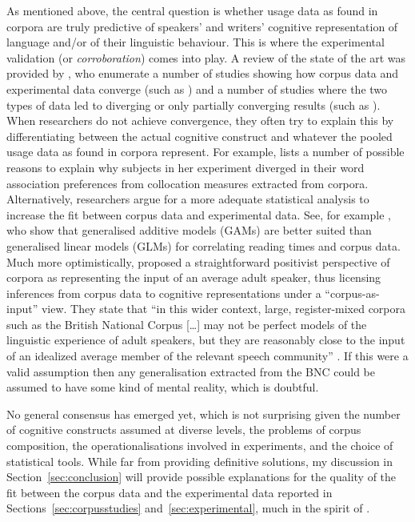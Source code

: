 As mentioned above, the central question is whether usage data as found in corpora are truly predictive of speakers' and writers' cognitive representation of language and\slash or of their linguistic behaviour.
This is where the experimental validation (or \textit{corroboration}) comes into play.
A review of the state of the art was provided by \cite{NewmanSorensenduncan2015}, who enumerate a number of studies showing how corpus data and experimental data converge (such as \citealp{BresnanEa2007,DurrantDoherty2010,GriesWulff2005,GriesEa2005}) and a number of studies where the two types of data led to diverging or only partially converging results (such as \citealp{ArppeJaervikivi2007,Dabrowska2014,Mollin2009}).
When researchers do not achieve convergence, they often try to explain this by differentiating between the actual cognitive construct and whatever the pooled usage data as found in corpora represent.
For example, \citet[411]{Dabrowska2014} lists a number of possible reasons to explain why subjects in her experiment diverged in their word association preferences from collocation measures extracted from corpora.
Alternatively, researchers argue for a more adequate statistical analysis to increase the fit between corpus data and experimental data.
See, for example \cite{DivjakEa2016}, who show that generalised additive models (GAMs) are better suited than generalised linear models (GLMs) for correlating reading times and corpus data. 
Much more optimistically, \cite{StefanowitschFlach2016} proposed a straightforward positivist perspective of corpora as representing the input of an average adult speaker, thus licensing inferences from corpus data to cognitive representations under a ``corpus-as-input'' view.
They state that ``in this wider context, large, register-mixed corpora such as the British National Corpus [\ldots] may not be perfect models of the linguistic experience of adult speakers, but they are reasonably close to the input of an idealized average member of the relevant speech community'' \citep[104]{StefanowitschFlach2016}.
If this were a valid assumption then any generalisation extracted from the BNC could be assumed to have some kind of mental reality, which is doubtful.

No general consensus has emerged yet, which is not surprising given the number of cognitive constructs assumed at diverse levels, the problems of corpus composition, the operationalisations involved in experiments, and the choice of statistical tools.
While far from providing definitive solutions, my discussion in Section~\ref{sec:conclusion} will provide possible explanations for the quality of the fit between the corpus data and the experimental data reported in Sections~\ref{sec:corpusstudies} and~\ref{sec:experimental}, much in the spirit of \citet{Dabrowska2014}.


